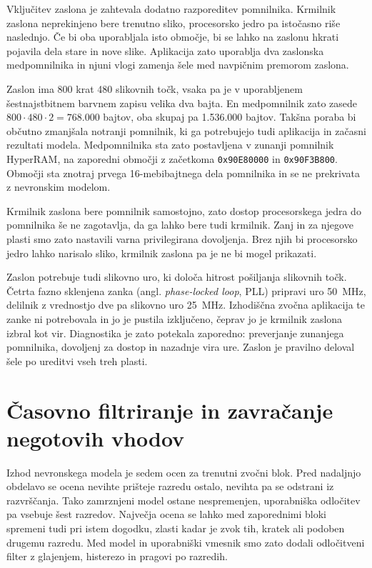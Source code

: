 Vključitev zaslona je zahtevala dodatno razporeditev pomnilnika. Krmilnik
zaslona neprekinjeno bere trenutno sliko, procesorsko jedro pa istočasno riše
naslednjo. Če bi oba uporabljala isto območje, bi se lahko na zaslonu hkrati
pojavila dela stare in nove slike. Aplikacija zato uporablja dva zaslonska
medpomnilnika in njuni vlogi zamenja šele med navpičnim premorom zaslona.

Zaslon ima 800 krat 480 slikovnih točk, vsaka pa je v uporabljenem
šestnajstbitnem barvnem zapisu velika dva bajta. En medpomnilnik zato zasede
$800 \cdot 480 \cdot 2 = 768.000$ bajtov, oba skupaj pa 1.536.000 bajtov.
Takšna poraba bi občutno zmanjšala notranji pomnilnik, ki ga potrebujejo tudi
aplikacija in začasni rezultati modela. Medpomnilnika sta zato postavljena v
zunanji pomnilnik HyperRAM, na zaporedni območji z začetkoma
\texttt{0x90E80000} in \texttt{0x90F3B800}. Območji sta znotraj prvega
16-mebibajtnega dela pomnilnika in se ne prekrivata z nevronskim modelom.

Krmilnik zaslona bere pomnilnik samostojno, zato dostop procesorskega jedra do
pomnilnika še ne zagotavlja, da ga lahko bere tudi krmilnik. Zanj in za njegove
plasti smo zato nastavili varna privilegirana dovoljenja. Brez njih bi
procesorsko jedro lahko narisalo sliko, krmilnik zaslona pa je ne bi mogel
prikazati.

Zaslon potrebuje tudi slikovno uro, ki določa hitrost pošiljanja slikovnih točk.
Četrta fazno sklenjena zanka (angl. \emph{phase-locked loop}, PLL) pripravi uro
\SI{50}{\mega\hertz}, delilnik z
vrednostjo dve pa slikovno uro \SI{25}{\mega\hertz}. Izhodiščna zvočna
aplikacija te zanke ni potrebovala in jo je pustila izključeno, čeprav jo je
krmilnik zaslona izbral kot vir. Diagnostika je zato potekala zaporedno:
preverjanje zunanjega pomnilnika, dovoljenj za dostop in nazadnje vira ure.
Zaslon je pravilno deloval šele po ureditvi vseh treh plasti.

\section{Časovno filtriranje in zavračanje negotovih vhodov}

Izhod nevronskega modela je sedem ocen za trenutni zvočni blok. Pred nadaljnjo
obdelavo se ocena nevihte prišteje razredu ostalo, nevihta pa se odstrani iz
razvrščanja. Tako zamrznjeni model ostane nespremenjen, uporabniška odločitev
pa vsebuje šest razredov. Največja ocena se lahko med zaporednimi bloki
spremeni tudi pri istem dogodku, zlasti kadar je zvok tih, kratek ali podoben
drugemu razredu. Med model in uporabniški vmesnik smo zato dodali odločitveni
filter z glajenjem, histerezo in pragovi po razredih.

